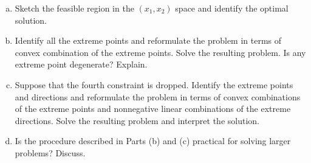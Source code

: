 \documentclass[12pt]{amsart}
\begin{document}
\begin{enumerate}[a.]
	\item 
	Sketch the feasible region in the \((x_1,x_2)\) space and identify the optimal solution.
	\item 
	Identify all the extreme points and reformulate the problem in terms of convex combination of the extreme points. 
	Solve the resulting problem. 
	Is any extreme point degenerate? Explain.
	\item 
	Suppose that the fourth constraint is dropped. Identify the extreme points and directions and reformulate the problem in terms of convex combinations of the extreme points and nonnegative linear combinations of the extreme directions. Solve the resulting problem and interpret the solution.
	\item 
	Is the procedure described in Parts (b) and (c) practical for solving larger problems? Discuss.
\end{enumerate}
\end{document}
